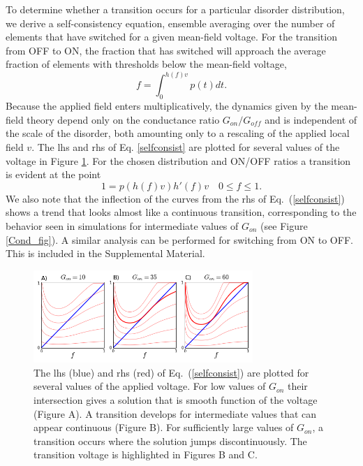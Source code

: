 \documentclass[aps,prl,reprint,groupedaddress]{revtex4-1}
\begin{document}
To determine whether a transition occurs for a particular disorder
distribution, we derive a
self-consistency equation, ensemble averaging over the number of elements
that have switched for a given mean-field voltage. For the transition from
OFF to ON, the fraction that has switched will approach the average fraction
of elements with thresholds below the mean-field voltage,
\begin{equation}\label{selfconsist}
f = \int_0^{h(f) v} p(t) dt.
\end{equation}
Because the applied field enters multiplicatively, the dynamics given by
the mean-field theory depend only on the conductance ratio $G_{on}/G_{off}$
and is independent of the scale of the disorder, both amounting only to
a rescaling of the applied local field $v$.  The lhs and
rhs of Eq. \ref{selfconsist} are plotted for several values of the voltage
in Figure \ref{MF_SC_fig}.  For
the chosen distribution and ON/OFF ratios a transition is evident at the
point
\begin{equation}\label{PT_eqn}
1 = p(h(f)v)h'(f)v \quad 0\le f\le 1.
\end{equation}
We also note that the inflection
of the curves from the rhs of Eq.~(\ref{selfconsist}) shows a trend that looks almost like a continuous
transition, corresponding to the behavior seen in simulations for intermediate
values of $G_{on}$ (see Figure \ref{Cond_fig}).
A similar analysis can be performed
for switching from ON to OFF. This is included in the Supplemental Material.

\begin{figure}
\includegraphics[width=8.3cm]{MF_self_consist.png}
\caption{The lhs (blue) and rhs (red) of Eq.~(\ref{selfconsist}) are plotted
for several values of the applied voltage.  For low values of $G_{on}$ their
intersection gives a solution that is smooth function of the voltage (Figure A).
A transition develops for intermediate values that can appear continuous
(Figure B). For sufficiently large values of $G_{on}$, a transition occurs where the
solution jumps discontinuously.  The transition voltage is highlighted in
Figures B and C.
\label{MF_SC_fig}}
\end{figure}
\end{document}
